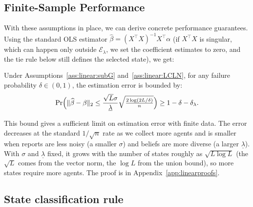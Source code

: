 \documentclass[12pt,reqno]{amsart}
\begin{document}
\subsection{Finite-Sample Performance}

With these assumptions in place, we can derive concrete performance
guarantees. Using the standard OLS estimator $\widehat{\beta}%
=(X^{\top}X)^{-1}X^{\top}\alpha$ (if $X^{\top}X$ is singular, which can happen only outside $\mathcal{E}_\lambda$, we set the coefficient estimates to zero, and the tie rule below still defines the selected state), we get:

\begin{lemma}\label{lem:linear:finite}
Under Assumptions~\ref{ass:linear:subG} and~\ref{ass:linear:LCLN}, for any  failure probability $\delta\in(0,1)$, the estimation error is bounded by:
\begin{equation}
  \Pr\Bigl(\|\widehat{\beta}-\beta\|_2 \le
          \frac{\sqrt{L}\sigma}{\underline\lambda}\sqrt{\tfrac{2\log(2L/\delta)}{n}}
  \Bigr) \ge 1-\delta{}-\delta_\lambda.
  \label{eq:error_bound}
\end{equation}
\end{lemma}

This bound gives a sufficient limit on estimation error with finite data.
The error decreases at the standard $1/\sqrt{n}$ rate as we collect more
agents and is smaller when reports are less noisy (a smaller $\sigma$) and beliefs are more diverse (a larger $\underline\lambda$). With $\sigma$ and $\underline\lambda$ fixed, it grows with the number of states roughly as $\sqrt{L\log L}$ (the $\sqrt L$ comes from the vector norm, the $\log L$ from the union bound), so more states require more agents. The proof is in Appendix~\ref{app:linearproofs}.



\subsection{State classification rule}
\end{document}
